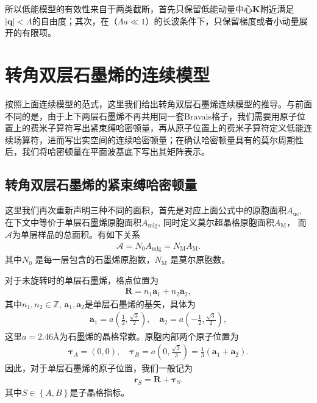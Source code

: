 \documentclass[10pt, oneside]{article}
\begin{document}
所以低能模型的有效性来自于两类截断，首先只保留低能动量中心\(\bm{K}\)附近满足\(\left|\bm{q}\right| < \Lambda\)的自由度；其次，在（\( \Lambda a \ll 1\)）的长波条件下，只保留梯度或者小动量展开的有限项。

 \section{转角双层石墨烯的连续模型}
按照上面连续模型的范式，这里我们给出转角双层石墨烯连续模型的推导。与前面不同的是，由于上下两层石墨烯不再共用同一套Bravais格子，我们需要用原子位置上的费米子算符写出紧束缚哈密顿量，再从原子位置上的费米子算符定义低能连续场算符，进而写出实空间的连续哈密顿量；在确认哈密顿量具有的莫尔周期性后，我们将哈密顿量在平面波基底下写出其矩阵表示。

\subsection{转角双层石墨烯的紧束缚哈密顿量}

这里我们再次重新声明三种不同的面积，首先是对应上面公式中的原胞面积\(A_{\mathrm{uc}}\), 在下文中等价于单层石墨烯原胞面积\(A_{\mathrm{mlg}}\), 同时定义莫尔超晶格原胞面积\(A_{\mathrm{M}}\)， 而\(\mathcal{A}\)为单层样品的总面积。有如下关系
\begin{align}
	\mathcal{A} = N_{0} A_{\mathrm{mlg}} = N_{\mathrm{M}} A_{\mathrm{M}}.
\end{align}
其中\( N_{0}\) 是每一层包含的石墨烯原胞数，\(N_{\mathrm{M}} \) 是莫尔原胞数。

对于未旋转时的单层石墨烯，格点位置为
\begin{align}
	\bm{R} = n_1 \bm{a}_{1} + n_{2} \bm{a}_{2},
\end{align}
其中\(n_{1},n_{2} \in \mathbb{Z}\), \( \bm{a}_{1},  \bm{a}_{2}\)是单层石墨烯的基矢，具体为
\begin{align}
	\bm{a}_{1} = a \left(\frac{1}{2}, \frac{\sqrt{3}}{2}\right),\quad \bm{a}_{2} = a \left(-\frac{1}{2}, \frac{\sqrt{3}}{2}\right),
\end{align}
这里\(a = 2.46\)\AA 为石墨烯的晶格常数。原胞内部两个原子位置为
\begin{align}
	\bm{\tau}_{A} = \left(0,0\right),\quad \bm{\tau}_{B} = a \left(0, \frac{\sqrt{3}}{3}\right) = \frac{1}{3} \left(\bm{a}_{1} + \bm{a}_{2}\right).
\end{align}
因此，对于单层石墨烯的原子位置，我们一般记为
\begin{align}
	\bm{r}_{S} = \bm{R} + \bm{\tau}_{S}.
\end{align}
其中\(S \in \left\{A,B\right\}\)是子晶格指标。
\vspace{2em}
\end{document}
